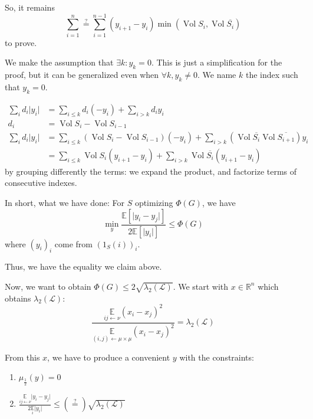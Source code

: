 \documentclass[12pt]{article}
\newcommand{\EE}{\mathbb{E}}
\newcommand{\RR}{\mathbb{R}}
\renewcommand{\L}{\mathcal{L}}
\newcommand{\la}{\leftarrow}
\newcommand{\esp}[2][]{\underset{#1}{\EE}\left[ #2 \right]}
\DeclareMathOperator{\vol}{Vol}
\begin{document}
So, it remains 
\[
    \sum\limits_{i=1}^n \overset{?}{=} \sum\limits_{i=1}^{n-1} (y_{i+1} - y_i) \min(\vol S_i, \vol \overline{S_i})
\]
to prove.

\bigskip


We make the assumption that $\exists k : y_k = 0$. This is just a simplification for the proof, but it can be generalized even when $\forall k, y_k \neq 0$. We name $k$ the index such that $y_k = 0$.

\[
    \begin{aligned}
        \sum\limits_i d_i\lvert y_i \rvert &= \sum\limits_{i\leqslant k} d_i(-y_i) + \sum\limits_{i > k}d_i y_i\\
       d_i &= \vol S_i - \vol S_{i-1}\\
       \sum\limits_i d_i\lvert y_i \rvert &= \sum\limits_{i\leqslant k} (\vol S_i - \vol S_{i-1})(-y_i) + \sum\limits_{i>k} \left(\vol \overline{S_i} \vol \overline{S_{i+1}} \right)y_i\\
       &= \sum\limits_{i\leqslant k} \vol S_i (y_{i+1} -y_i) + \sum\limits_{i>k} \vol \overline{S_i} (y_{i+1} - y_i)
    \end{aligned}
\]
by grouping differently the terms: we expand the product, and factorize terms of consecutive indexes.

In short, what we have done: For $S$ optimizing $\Phi(G)$, we have
\[
    \min\limits_y \frac{\esp{\lvert y_i-y_j\rvert}}{2\esp{\lvert y_i \rvert}} \leqslant \Phi(G)
\]
where $(y_i)_i$ come from $(1_S(i))_i$.

\bigskip

Thus, we have the equality we claim above.

\bigskip

Now, we want to obtain $\Phi(G) \leqslant 2\sqrt{\lambda_2(\L)}$. We start with $x\in\RR^n$ which obtains $\lambda_2(\L)$:
\[
    \frac{\underset{ij\la \nu}{\EE}(x_i-x_j)^2}{\underset{(i,j)\la\mu\times\mu}{\EE}(x_i-x_j)^2} = \lambda_2(\L)
\]

From this $x$, we have to produce a convenient $y$ with the constraints:
\begin{enumerate}[(1)]
    \item $\mu_{\frac{1}{2}}(y) = 0$
    \item $\frac{\underset{ij\la\nu}{\EE}\lvert y_i-y_j\rvert}{2\underset{i}{\EE}\lvert y_i \rvert} \leqslant (\overset{?}{=}) \sqrt{\lambda_2(\L)}$
\end{enumerate}
\end{document}

